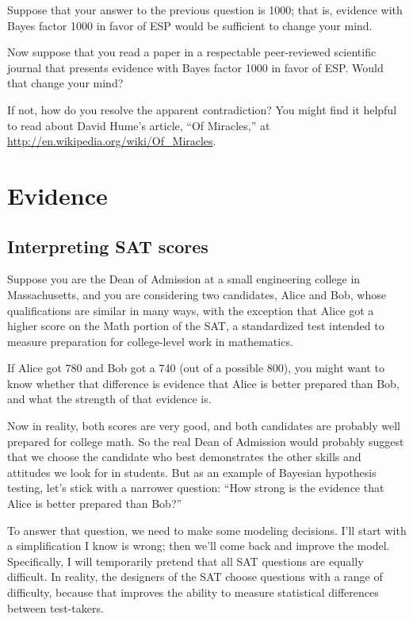 \documentclass[12pt]{book}
\begin{document}
\begin{exercise}
Suppose that your answer to the previous question is 1000;
that is, evidence with Bayes factor 1000 in favor of ESP would
be sufficient to change your mind.

Now suppose that you read a paper in a respectable peer-reviewed
scientific journal that presents evidence with Bayes factor 1000 in
favor of ESP.  Would that change your mind?

If not, how do you resolve the apparent contradiction?
You might find it helpful to read about David Hume's article, ``Of
Miracles,'' at \url{http://en.wikipedia.org/wiki/Of_Miracles}.

\end{exercise}



\chapter{Evidence}
\label{evidence}

\section{Interpreting SAT scores}

Suppose you are the Dean of Admission at a small engineering
college in Massachusetts, and you are considering two candidates,
Alice and Bob, whose qualifications are similar in many ways,
with the exception that Alice got a higher score on the Math
portion of the SAT, a standardized test intended to measure
preparation for college-level work in mathematics.

If Alice got 780 and Bob got a 740 (out of a possible 800), you might
want to know whether that difference is evidence that Alice is better
prepared than Bob, and what the strength of that evidence is.

Now in reality, both scores are very good, and both 
candidates are probably well prepared for college math.  So
the real Dean of Admission would probably suggest that we choose
the candidate who best demonstrates the other skills and
attitudes we look for in students.  But as an example of
Bayesian hypothesis testing, let's stick with a narrower question:
``How strong is the evidence that Alice is better prepared
than Bob?''

To answer that question, we need to make some modeling decisions.
I'll start with a simplification I know is wrong; then we'll come back
and improve the model.  Specifically, I will temporarily pretend that
all SAT questions are equally difficult.  In reality, the designers of
the SAT choose questions with a range of difficulty, because that
improves the ability to measure statistical differences between
test-takers.
\end{document}
